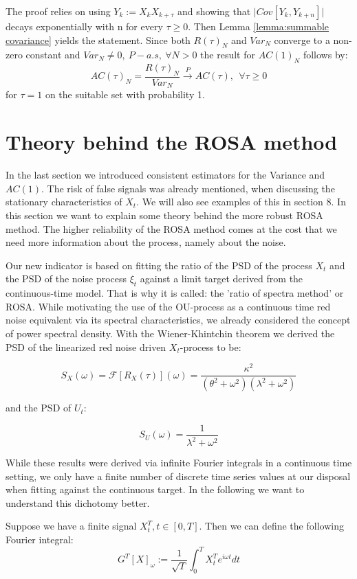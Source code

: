 \documentclass[%
thesis=student,%
coverpage=false,%
titlepage=false,%
headmarks=true, %
english,%
font=libertine, %
math=newpxtx, %
BCOR=5mm,%
coverBCOR=11mm%
]{tumbook}
\begin{document}
The proof relies on using $Y_{k} := X_{k}X_{k+\tau}$ and showing that $\lvert Cov[Y_{k},Y_{k+n}] \rvert$ decays exponentially with n for every $\tau \geq 0$. Then Lemma \ref{lemma:summable covariance} yields the statement. Since both $R(\tau)_{N}$ and $Var_{N}$ converge to a non-zero constant and $Var_N \neq 0, \ P-a.s, \ \forall N > 0$ the result for $AC(1)_{N}$ follows by:
\[
AC(\tau)_N = \frac{R(\tau)_{N}}{Var_{N}} \xrightarrow{P} AC(\tau), \ \ \forall \tau \geq 0
\]
for $\tau = 1$ on the suitable set with probability 1.



\chapter{Theory behind the ROSA method}

In the last section we introduced consistent estimators for the Variance and $AC(1)$. The risk of false signals was already mentioned, when discussing the stationary characteristics of $X_{t}$. We will also see examples of this in section 8. In this section we want to explain some theory behind the more robust ROSA method. The higher reliability of the ROSA method comes at the cost that we need more information about the process, namely about the noise. 

Our new indicator is based on fitting the ratio of the PSD of the process $X_{t}$ and the PSD of the noise process $\xi_{t}$ against a limit target derived from the continuous-time model. That is why it is called: the 'ratio of spectra method' or ROSA. While motivating the use of the OU-process as a continuous time red noise equivalent via its spectral characteristics, we already considered the concept of power spectral density. With the Wiener-Khintchin theorem we derived the PSD of the linearized red noise driven $X_{t}$-process to be:

\[
S_{X}(\omega) = \mathcal{F}[R_{X}(\tau)](\omega) = \frac{\kappa^{2}}{(\theta^{2} + \omega^{2})(\lambda^{2} + \omega^{2})}
\]

and the PSD of $U_{t}$:

\[
S_{U}(\omega) = \frac{1}{\lambda^2 + \omega^2}
\]

While these results were derived via infinite Fourier integrals in a continuous time setting, we only have a finite number of discrete time series values at our disposal when fitting against the continuous target. In the following we want to understand this dichotomy better.

Suppose we have a finite signal $X_{t}^{T}, t \in [0,T]$. Then we can define the following Fourier integral: 
\[
    G^{T}[X]_{\omega} := \frac{1}{\sqrt{T}}\int_{0}^{T}X_{t}^{T}e^{i \omega t}dt
\]
\end{document}
